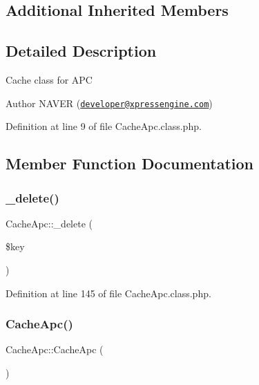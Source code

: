 \subsection*{Additional Inherited Members}


\subsection{Detailed Description}
Cache class for A\+PC

\begin{DoxyAuthor}{Author}
N\+A\+V\+ER (\href{mailto:developer@xpressengine.com}{\tt developer@xpressengine.\+com}) 
\end{DoxyAuthor}


Definition at line 9 of file Cache\+Apc.\+class.\+php.



\subsection{Member Function Documentation}
\hypertarget{classCacheApc_a14d5f6b3e8743ea43ad3307816cec95d}{}\label{classCacheApc_a14d5f6b3e8743ea43ad3307816cec95d} 
\subsubsection{\texorpdfstring{\+\_\+delete()}{\_delete()}}
{\footnotesize\ttfamily Cache\+Apc\+::\+\_\+delete (\begin{DoxyParamCaption}\item[{}]{\$key }\end{DoxyParamCaption})}



Definition at line 145 of file Cache\+Apc.\+class.\+php.

\hypertarget{classCacheApc_ae75af46358f790955fce6c7fdb99ffdc}{}\label{classCacheApc_ae75af46358f790955fce6c7fdb99ffdc} 
\subsubsection{\texorpdfstring{Cache\+Apc()}{CacheApc()}}
{\footnotesize\ttfamily Cache\+Apc\+::\+Cache\+Apc (\begin{DoxyParamCaption}{ }\end{DoxyParamCaption})}

